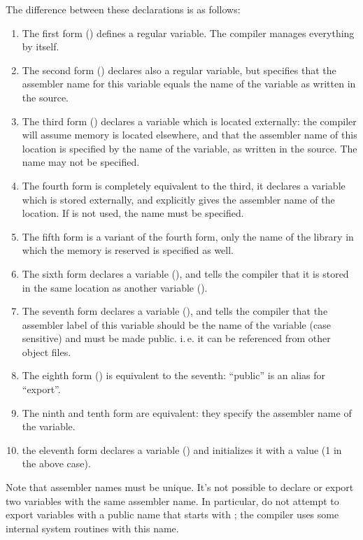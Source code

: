 The difference between these declarations is as follows:
\begin{enumerate}
\item The first form () defines a regular variable. The
compiler manages everything by itself.
\item The second form () declares also a regular variable,
but specifies that the assembler name for this variable equals the name
of the variable as written in the source.
\item The third form () declares a variable which is located
externally: the compiler will assume memory is located elsewhere, and that
the assembler name of this location is specified by the name of the
variable, as written in the source. The name may not be specified.
\item The fourth form is completely equivalent to the third, it declares a
variable which is stored externally, and explicitly gives the assembler
name of the location. If  is not used, the name must be specified.
\item The fifth form is a variant of the fourth form, only the name of the
library in which the memory is reserved is specified as well.
\item The sixth form declares a variable (), and tells the compiler that it is
stored in the same location as another variable ().
\item The seventh form declares a variable (), and tells the
compiler that the assembler label of this variable should be the name of the
variable (case sensitive) and must be made public. i.\,e. it can be
referenced from other object files.
\item The eighth form () is equivalent to the seventh: ``public''
is an alias for ``export''.
\item The ninth and tenth form are equivalent: they specify the assembler
name of the variable.
\item the eleventh form declares a variable () and
initializes it with a value (1 in the above case).
\end{enumerate}
Note that assembler names must be unique. It's not possible to declare or
export two variables with the same assembler name. In particular, do not
attempt to export variables with a public name that starts with ;
the compiler uses some internal system routines with this name.



